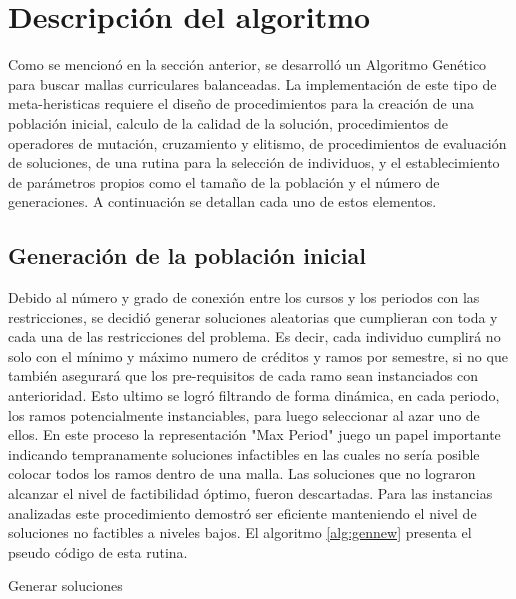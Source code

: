 \documentclass[letter, 10pt]{article}
\begin{document}
\section{Descripción del algoritmo}
Como se mencionó en la sección anterior, se desarrolló un Algoritmo Genético para buscar mallas curriculares balanceadas.
La implementación de este tipo de meta-heristicas requiere el diseño de procedimientos para la creación
de una población inicial, calculo de la calidad de la solución, procedimientos de operadores de mutación, cruzamiento y elitismo, de procedimientos de evaluación de soluciones, de una rutina para la selección de individuos, y el establecimiento de parámetros propios como el tamaño de la población y el número de generaciones.
A continuación se detallan cada uno de estos elementos.

\subsection{Generación de la población inicial}
Debido al número y grado de conexión entre los cursos y  los periodos con las restricciones, se decidió generar soluciones aleatorias que cumplieran con toda
y cada una de las restricciones del problema. Es decir, cada individuo cumplirá no solo con el mínimo y máximo numero de créditos y ramos por semestre, si no que también asegurará que los pre-requisitos de cada ramo sean instanciados con anterioridad. Esto ultimo se logró filtrando de forma dinámica, en cada periodo, los ramos
potencialmente instanciables, para luego seleccionar al azar uno de ellos. En este proceso  la representación "Max Period" juego un papel importante indicando
tempranamente soluciones infactibles en las cuales no sería posible colocar todos los ramos dentro de una malla. Las soluciones que no lograron alcanzar el nivel de factibilidad óptimo, fueron descartadas. Para las instancias analizadas este procedimiento demostró ser eficiente manteniendo el nivel de soluciones no factibles a niveles bajos. El algoritmo \ref{alg:gennew} presenta el pseudo código de esta rutina.

\begin{algorithm}[H]
\SetLine
{}
\caption{Generar soluciones}
\label{alg:gennew}
\end{algorithm}
\end{document}
